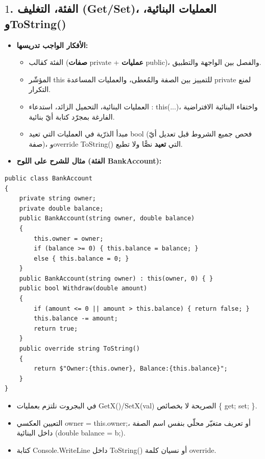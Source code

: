 \documentclass[14pt]{extarticle}
\begin{document}
\subsection*{$1$. الفئة، التغليف (\textenglish{Get}/\textenglish{Set})، العمليات البنائية، و\textenglish{ToString()}}
\begin{itemize}[itemsep=0.25em]
    \item \textbf{الأفكار الواجب تدريسها:}
    \begin{itemize}
        \item الفئة كقالب (\textbf{صفات} \textenglish{private} + \textbf{عمليات} \textenglish{public})، والفصل بين الواجهة والتطبيق.
        \item المؤشّر \textenglish{this} للتمييز بين الصفة والمُعطى، والعمليات المساعدة \textenglish{private} لمنع التكرار.
        \item العمليات البنائية، التحميل الزائد، استدعاء \textenglish{: this(...)}، واختفاء البنائية الافتراضية الفارغة بمجرّد كتابة أيّ بنائية.
        \item مبدأ الذرّية في العمليات التي تعيد \textenglish{bool} (فحص جميع الشروط قبل تعديل أيّ صفة)، و\textenglish{override ToString()} التي \textbf{تعيد} نصًّا ولا تطبع.
    \end{itemize}
    \item \textbf{مثال للشرح على اللوح (الفئة \textenglish{BankAccount}):}
\end{itemize}
\begin{boxCode}
\begin{english}
\begin{verbatim}
public class BankAccount
{
    private string owner;
    private double balance;
    public BankAccount(string owner, double balance)
    {
        this.owner = owner;
        if (balance >= 0) { this.balance = balance; }
        else { this.balance = 0; }
    }
    public BankAccount(string owner) : this(owner, 0) { }
    public bool Withdraw(double amount)
    {
        if (amount <= 0 || amount > this.balance) { return false; }
        this.balance -= amount;
        return true;
    }
    public override string ToString()
    {
        return $"Owner:{this.owner}, Balance:{this.balance}";
    }
}
\end{verbatim}
\end{english}
\end{boxCode}
\begin{boxWarning}
\begin{itemize}
    \item في البجروت نلتزم بعمليات \textenglish{GetX()}/\textenglish{SetX(val)} الصريحة لا بخصائص \textenglish{\{ get; set; \}}.
    \item التعيين العكسي \textenglish{owner = this.owner;}، أو تعريف متغيّر محلّي بنفس اسم الصفة داخل البنائية (\textenglish{double balance = b;}).
    \item كتابة \textenglish{Console.WriteLine} داخل \textenglish{ToString()} أو نسيان كلمة \textenglish{override}.
\end{itemize}
\end{boxWarning}
\end{document}
